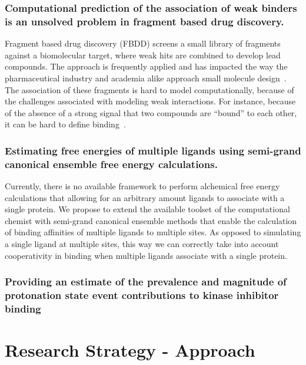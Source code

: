 \documentclass[10pt,final]{article}
\newif\ifinstr
\newcommand{\instr}[1]{\ifdraft{\ifinstr {\color{cyan}\emph{#1}} \fi}{}}
\begin{document}

\subsubsection*{Computational prediction of the association of weak binders is an unsolved problem in fragment based drug discovery.}
Fragment based drug discovery (FBDD) screens a small library of fragments against a biomolecular target, where weak hits are combined to develop lead compounds.
%
The approach is frequently applied and has impacted the way the pharmaceutical industry and academia alike approach small molecule design~\autocite{Hajduk2007a}.
%
The association of these fragments is hard to model computationally, because of the challenges associated with modeling weak interactions.
%
For instance, because of the absence of a strong signal that two compounds are ``bound'' to each other, it can be hard to define binding~\autocite{Gilson1997a}. 


\subsubsection*{Estimating free energies of multiple ligands using semi-grand canonical ensemble free energy calculations.}
Currently, there is no available framework to perform alchemical free energy calculations that allowing for an arbitrary amount ligands to associate with a single protein.
%
We propose to extend the available toolset of the computational chemist with semi-grand canonical ensemble methods that enable the calculation of binding affinities of multiple ligands to multiple sites.
%
As opposed to simulating a single ligand at multiple sites, this way we can correctly take into account cooperativity in binding when multiple ligands associate with a single protein.

\subsubsection*{Providing an estimate of the prevalence and magnitude of protonation state event contributions to kinase inhibitor binding}


\section*{Research Strategy - Approach}
\instr{Approach: More specific background information. Describe in detail the experimental design and research methods to be used. Technical hurdles to be overcome should be mentioned. Alternative approaches should be given for experiments that may not be feasible. Discussion of expected or possible results and their interpretation. Best format for each specific aim: a) rationale, b) methods, c) expected results, d) alternatives. Theory aims should follow a similar structure where possible.}
\end{document}
